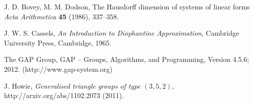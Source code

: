 \documentclass[11pt]{article}  %
\theoremstyle{definition}
\theoremstyle{remark}
\begin{document}
%
%
%
\begin{thebibliography}{99}

% 
%



%
J. D. Bovey, M. M. Dodson,                         %
The Hausdorff dimension of systems of linear forms %
{\em Acta Arithmetica}                             %
{\bf 45}                                           %
(1986), 337--358.                                   %

%
J. W. S. Cassels,                                  %
{\em An Introduction to Diophantine Approximation},%
Cambridge University Press, Cambridge, 1965.       %

%
The GAP Group, GAP -- Groups, Algorithms, and Programming,  %
Version 4.5.6; 2012. %
(http://www.gap-system.org)  %


%
J. Howie,                                            %
{\em Generalised triangle groups of type $(3,5,2)$}, %
http://arxiv.org/abs/1102.2073                       %
(2011).                                              %
\end{thebibliography}
\end{document}
